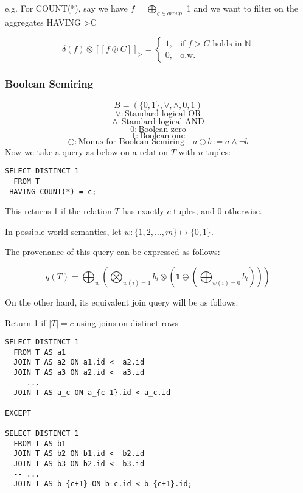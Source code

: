 \documentclass[twocolumn]{article}
\begin{document}
e.g. For COUNT(*), say we have $f=\bigoplus_{g \in group}$ 1 and we want to filter on the aggregates HAVING >C

$$
 \delta(f)\otimes[[f \oslash   C]]_{\mathit{>}}=\begin{cases}1, & \text{if } f>C \text{ holds in } \mathbb{N} \\
0,&\text{o.w.}\end{cases}
$$

\subsubsection{Boolean Semiring}
$$B = (\{0,1\}, \lor, \land, 0, 1)$$
$$\lor : \text{Standard logical OR}$$
$$\land : \text{Standard logical AND}$$
$$0 : \text{Boolean zero}$$
$$1 : \text{Boolean one}$$
\[
\ominus: \text{Monus for Boolean Semiring} \quad a \ominus b := a \land \neg b
\]
Now we take a query as below on a relation $T$ with $n$ tuples:

\begin{listing}[ht]
\begin{verbatim}
SELECT DISTINCT 1
  FROM T
 HAVING COUNT(*) = c;
\end{verbatim}
\end{listing}

This returns 1 if the relation $T$ has exactly $c$ tuples, and 0 otherwise.

In possible world semantics, let $w: \{1,2,\dots,m\} \mapsto \{0,1\}$.

The provenance of this query can be expressed as follows:

$$q(T) = \bigoplus_{w}\left(\bigotimes_{w(i)=1}b_i\otimes\left(\mathbb{1}\ominus(\bigoplus_{w(i) =0}b_i)\right)\right)$$

On the other hand, its equivalent join query will be as follows:

\begin{listing}[ht]
\caption{Return 1 if \(|T| = c\) using joins on distinct rows}
\begin{verbatim}
SELECT DISTINCT 1
  FROM T AS a1
  JOIN T AS a2 ON a1.id <  a2.id
  JOIN T AS a3 ON a2.id <  a3.id
  -- ...
  JOIN T AS a_c ON a_{c-1}.id < a_c.id

EXCEPT

SELECT DISTINCT 1
  FROM T AS b1
  JOIN T AS b2 ON b1.id <  b2.id
  JOIN T AS b3 ON b2.id <  b3.id
  -- ...
  JOIN T AS b_{c+1} ON b_c.id < b_{c+1}.id;
\end{verbatim}
\end{listing}
\end{document}
